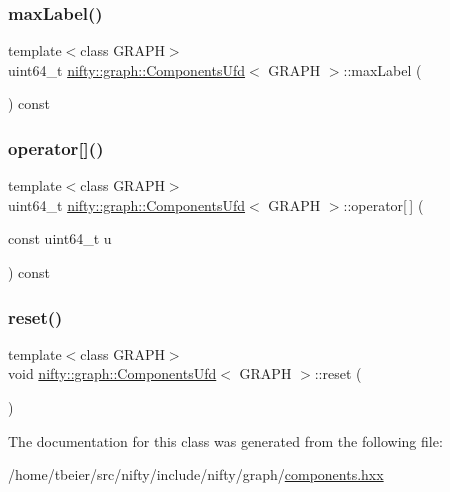 \subsubsection{\texorpdfstring{max\+Label()}{maxLabel()}}
{\footnotesize\ttfamily template$<$class G\+R\+A\+PH$>$ \\
uint64\+\_\+t \hyperlink{classnifty_1_1graph_1_1ComponentsUfd}{nifty\+::graph\+::\+Components\+Ufd}$<$ G\+R\+A\+PH $>$\+::max\+Label (\begin{DoxyParamCaption}{ }\end{DoxyParamCaption}) const\hspace{0.3cm}{\ttfamily [inline]}}

\mbox{\label{classnifty_1_1graph_1_1ComponentsUfd_a9b49939a2a5ffe4ae5c246d65d4302aa}} 
\subsubsection{\texorpdfstring{operator[]()}{operator[]()}}
{\footnotesize\ttfamily template$<$class G\+R\+A\+PH$>$ \\
uint64\+\_\+t \hyperlink{classnifty_1_1graph_1_1ComponentsUfd}{nifty\+::graph\+::\+Components\+Ufd}$<$ G\+R\+A\+PH $>$\+::operator\mbox{[}$\,$\mbox{]} (\begin{DoxyParamCaption}\item[{const uint64\+\_\+t}]{u }\end{DoxyParamCaption}) const\hspace{0.3cm}{\ttfamily [inline]}}

\mbox{\label{classnifty_1_1graph_1_1ComponentsUfd_af5c4c45f3de807f548f07060e4ac5ed5}} 
\subsubsection{\texorpdfstring{reset()}{reset()}}
{\footnotesize\ttfamily template$<$class G\+R\+A\+PH$>$ \\
void \hyperlink{classnifty_1_1graph_1_1ComponentsUfd}{nifty\+::graph\+::\+Components\+Ufd}$<$ G\+R\+A\+PH $>$\+::reset (\begin{DoxyParamCaption}{ }\end{DoxyParamCaption})\hspace{0.3cm}{\ttfamily [inline]}}



The documentation for this class was generated from the following file\+:\begin{DoxyCompactItemize}
\item 
/home/tbeier/src/nifty/include/nifty/graph/\hyperlink{components_8hxx}{components.\+hxx}\end{DoxyCompactItemize}
